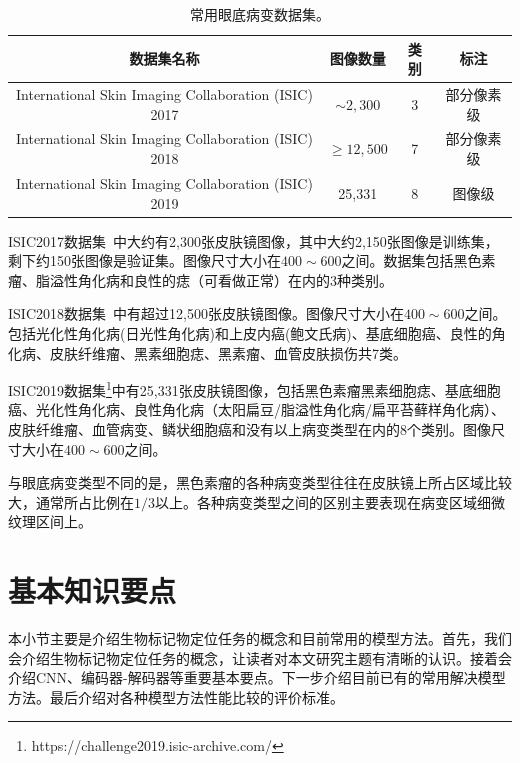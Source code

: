 \begin{table}[h]
	\centering
	\caption{常用眼底病变数据集。}		
	\label{tab:skin_datasets_info}
	\begin{tabular}{c|c|c|c}
		\toprule[2pt]
		数据集名称 & 图像数量 & 类别 & 标注 \\
		\midrule[2pt]
		
		International Skin Imaging Collaboration (ISIC) 2017 &  $\sim 2,300$ & 3 & 部分像素级 \\ \hline
		International Skin Imaging Collaboration (ISIC) 2018 & $\geq 12,500$ & 7  & 部分像素级 \\ \hline
		International Skin Imaging Collaboration (ISIC) 2019 & 25,331 & 8  & 图像级  \\ 
		\bottomrule[2pt]
	\end{tabular}
\end{table}

ISIC2017数据集~\cite{codella2018skin}中大约有2,300张皮肤镜图像，其中大约2,150张图像是训练集，剩下约150张图像是验证集。图像尺寸大小在$400\sim 600$之间。数据集包括黑色素瘤、脂溢性角化病和良性的痣（可看做正常）在内的3种类别。

ISIC2018数据集~\cite{codella2019skin, tschandl2018ham10000}中有超过12,500张皮肤镜图像。图像尺寸大小在$400\sim 600$之间。包括光化性角化病(日光性角化病)和上皮内癌(鲍文氏病)、基底细胞癌、良性的角化病、皮肤纤维瘤、黑素细胞痣、黑素瘤、血管皮肤损伤共7类。

ISIC2019数据集\footnote{https://challenge2019.isic-archive.com/}中有25,331张皮肤镜图像，包括黑色素瘤黑素细胞痣、基底细胞癌、光化性角化病、良性角化病（太阳扁豆/脂溢性角化病/扁平苔藓样角化病）、皮肤纤维瘤、血管病变、鳞状细胞癌和没有以上病变类型在内的8个类别。图像尺寸大小在$400\sim 600$之间。

与眼底病变类型不同的是，黑色素瘤的各种病变类型往往在皮肤镜上所占区域比较大，通常所占比例在$1/3$以上。各种病变类型之间的区别主要表现在病变区域细微纹理区间上。

\section{基本知识要点}
本小节主要是介绍生物标记物定位任务的概念和目前常用的模型方法。首先，我们会介绍生物标记物定位任务的概念，让读者对本文研究主题有清晰的认识。接着会介绍CNN、编码器-解码器等重要基本要点。下一步介绍目前已有的常用解决模型方法。最后介绍对各种模型方法性能比较的评价标准。

